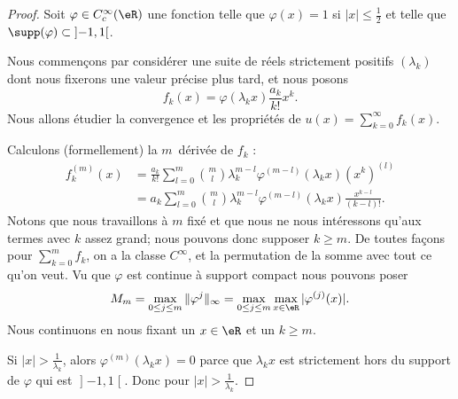 \begin{proof}
	Soit \( \varphi\in C^{\infty}_c(\eR)\) une fonction telle que \( \varphi(x)=1\) si \( | x |\leq \frac{ 1 }{2}\) et telle que \( \supp(\varphi)\subset\mathopen] -1 , 1 \mathclose[\).

		Nous commençons par considérer une suite de réels strictement positifs \( (\lambda_k)\) dont nous fixerons une valeur précise plus tard, et nous posons
		\begin{equation}
			f_k(x)=\varphi(\lambda_k x)\frac{ a_k }{ k! }x^k.
		\end{equation}
		Nous allons étudier la convergence et les propriétés de \( u(x)=\sum_{k=0}^{\infty}f_k(x)\).

		Calculons (formellement) la \( m\)\ieme\ dérivée de \( f_k\) :
		\begin{subequations}
			\begin{align}
				f_k^{(m)}(x) & =\frac{ a_k }{ k! }\sum_{l=0}^{m}\binom{ m }{ l }\lambda_k^{m-l}\varphi^{(m-l)}(\lambda_kx)(x^k)^{(l)}  \\
				             & =a_k\sum_{l=0}^{m}\binom{ m }{ l }\lambda_k^{m-l}\varphi^{(m-l)}(\lambda_kx)\frac{ x^{k-l} }{ (k-l)! }.
			\end{align}
		\end{subequations}
		Notons que nous travaillons à \( m\) fixé et que nous ne nous intéressons qu'aux termes avec \( k\) assez grand; nous pouvons donc supposer \( k\geq m\). De toutes façons pour \( \sum_{k=0}^mf_k\), on a la classe \(  C^{\infty}\), et la permutation de la somme avec tout ce qu'on veut. Vu que \( \varphi\) est continue à support compact nous pouvons poser
		\begin{equation}
			M_m=\max_{0\leq j\leq m}\| \varphi^{j} \|_{\infty}=\max_{0\leq j\leq m}\max_{x\in \eR}| \varphi^{(j)}(x) |.
		\end{equation}
		Nous continuons en nous fixant un \( x\in \eR\) et un \( k\geq m\).

		Si \( | x |>\frac{1}{ \lambda_k }\), alors \( \varphi^{(m)}(\lambda_kx)=0\) parce que \( \lambda_kx\) est strictement hors du support de \( \varphi\) qui est \( \mathopen] -1 , 1 \mathclose[\). Donc pour \( | x |>\frac{1}{ \lambda_k }\).


\end{proof}

